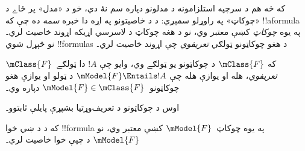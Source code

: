 \documentclass[../../../include/open-logic-section]{subfiles}
\begin{document}


که څه هم د  سرچپه استلزامونه د مدلونو
دپاره سم نۀ دي، خو د «مدل» پر ځاے د «چوکاټ» په راوړلو سمېږي: د
 د خاصيتونو په اړه دا خبره \emph{سمه}
ده چې که !!a{formula} په يوه \emph{چوکاټ} کښې معتبر وي، نو د هغه
چوکاټ د لاسرسي اړيکه اړوند خاصيت لري۔ نو څېړل شوي !!{formula}s
د هغو چوکاټونو ټولګي \emph{تعريفوي} چې اړوند خاصيت لري۔

\begin{defn}
  که $\mClass{F}$ د چوکاټونو يو ټولګے وي، وايو چې $!A$
  دا ټولګے~$\mClass{F}$ \emph{تعريفوي}، هله او يوازې هله چې
  $\mModel{F} \Entails !A$ د ټولو او يوازې هغو
  چوکاټونو~$\mModel{F} \in \mClass{F}$ دپاره وي۔
\end{defn}

اوس د چوکاټونو د تعريف‌وړتيا بشپړې پايلې ثابتوو۔

\begin{thm}
که د  د ښي خوا !!{formula} په يوه
چوکاټ~$\mModel{F}$ کښې معتبر وي، نو $\mModel{F}$ د چپې خوا
خاصيت لري۔
\end{thm}
\end{document}
